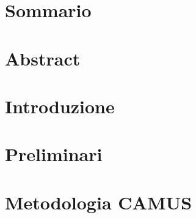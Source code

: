 \documentclass[11pt,english,italian,openright]{book}
\begin{document}
\frontmatter
\pagestyle{empty}
\restoregeometry

\cleardoublepage{}

\begin{flushright}
\emph{}\cleardoublepage{}
\par\end{flushright}





\chapter*{Sommario}

\thispagestyle{empty}\cleardoublepage{}


\chapter*{Abstract}

\thispagestyle{empty}\cleardoublepage{}
\setcounter{page}{1}
\pagestyle{fancy}\tableofcontents{}\listoffigures
\listoftables
{}
\renewcommand\lstlistlistingname{Elenco dei listati}
\listoflistings
\cleardoublepage{}\mainmatter
\renewcommand{\sectionmark}[1]{\markright{\thesection.\ #1}}
\renewcommand{\chaptermark}[1]{\markboth{\thechapter.\ #1}{}}


\chapter{Introduzione\label{ch:introduzione}}




\chapter{Preliminari\label{ch:nozioni-preliminari}}




\chapter{Metodologia CAMUS\label{ch:metodologia-camus}}
\end{document}
